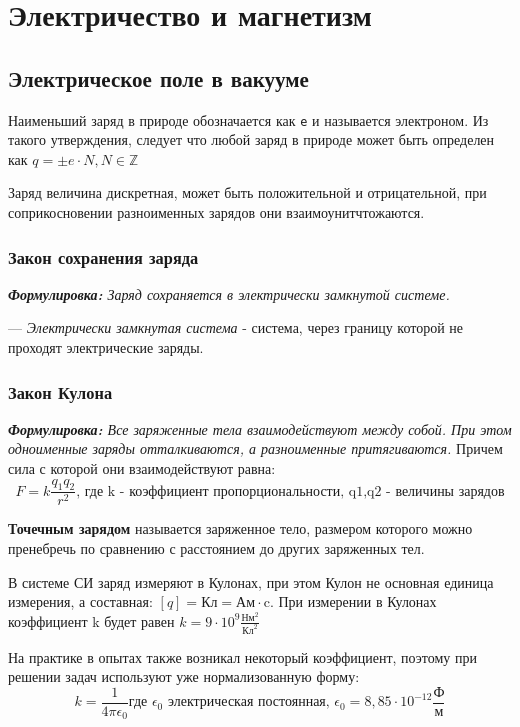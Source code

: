 \documentclass[../main.tex]{subfiles}
\begin{document}
\chapter{Электричество и магнетизм}

\section{Электрическое поле в вакууме}
Наименьший заряд в природе обозначается как \texttt{e} и называется электроном. Из такого утверждения, следует что любой заряд в природе может быть определен как  $ q = \pm e \cdot N, N \in \mathbb{Z}$

Заряд величина дискретная, может быть положительной и отрицательной, при соприкосновении разноименных зарядов они взаимоунитчтожаются.
\subsection{Закон сохранения заряда}
\textit{\textbf{Формулировка:} Заряд сохраняется в электрически замкнутой системе.}

--- \textit{Электрически замкнутая система} - система, через границу которой не проходят электрические заряды.

\subsection{Закон Кулона}
\textit{\textbf{Формулировка:} Все заряженные тела взаимодействуют между собой. При этом одноименные заряды отталкиваются, а разноименные притягиваются.}
Причем сила с которой они взаимодействуют равна:
\[ F = k\frac{q_1 q_2}{r^2} \text{, где k - коэффициент пропорциональности, q1,q2 - величины зарядов}\]

 \textbf{Точечным зарядом} называется заряженное тело, размером которого можно пренебречь по сравнению с расстоянием до других заряженных тел.

В системе СИ заряд измеряют в Кулонах, при этом Кулон не основная единица измерения, а составная: $[q] = \text{Кл} = \text{Ам} \cdot \text{c}$. При измерении в Кулонах коэффициент k будет равен $k = 9 \cdot 10^9 \frac{\text{Нм}^2}{\text{Кл}^2}$

На практике в опытах также возникал некоторый коэффициент, поэтому при решении задач используют уже нормализованную форму:
\[ k = \frac{1}{4 \pi \epsilon_0} \text{где $\epsilon_0$ электрическая постоянная,  } \epsilon_0 = 8,85 \cdot10^{-12} \frac{\text{Ф}}{\text{м}}\]
\end{document}
